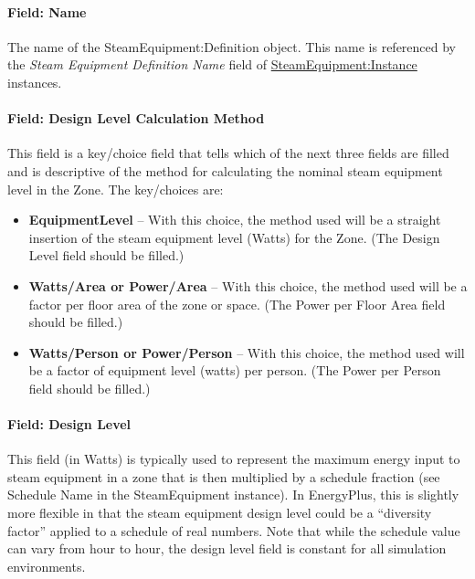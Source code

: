 \paragraph{Field: Name}\label{field-name-steamequipmentdefinition}

The name of the SteamEquipment:Definition object. This name is referenced by the \textit{Steam Equipment Definition Name} field of \hyperref[steamequipmentinstance]{SteamEquipment:Instance} instances.

\paragraph{Field: Design Level Calculation Method}\label{field-design-level-calculation-method-4-steam-definition}

This field is a key/choice field that tells which of the next three fields are filled and is descriptive of the method for calculating the nominal steam equipment level in the Zone. The key/choices are:

\begin{itemize}
\tightlist
\item
  \textbf{EquipmentLevel} -- With this choice, the method used will be a straight insertion of the steam equipment level (Watts) for the Zone. (The Design Level field should be filled.)
\item
  \textbf{Watts/Area or Power/Area} -- With this choice, the method used will be a factor per floor area of the zone or space. (The Power per Floor Area field should be filled.)
\item
  \textbf{Watts/Person or Power/Person} -- With this choice, the method used will be a factor of equipment level (watts) per person. (The Power per Person field should be filled.)
\end{itemize}

\paragraph{Field: Design Level}\label{field-design-level-3-steam-definition}

This field (in Watts) is typically used to represent the maximum energy input to steam equipment in a zone that is then multiplied by a schedule fraction (see Schedule Name in the SteamEquipment instance). In EnergyPlus, this is slightly more flexible in that the steam equipment design level could be a ``diversity factor'' applied to a schedule of real numbers. Note that while the schedule value can vary from hour to hour, the design level field is constant for all simulation environments.

